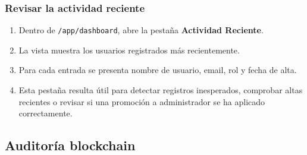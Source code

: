 \documentclass[11pt, a4paper]{article}
\begin{document}
\subsubsection{Revisar la actividad reciente}

\begin{enumerate}
    \item Dentro de \texttt{/app/dashboard}, abre la pestaña \textbf{Actividad Reciente}.
    \item La vista muestra los usuarios registrados más recientemente.
    \item Para cada entrada se presenta nombre de usuario, email, rol y fecha de alta.
    \item Esta pestaña resulta útil para detectar registros inesperados, comprobar altas recientes o revisar si una promoción a administrador se ha aplicado correctamente.
\end{enumerate}

\subsection{Auditoría blockchain}
\end{document}
